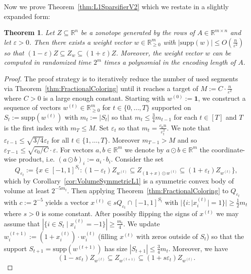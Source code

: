 \documentclass[12pt,english]{article}
\theoremstyle{theorem}
\newtheorem{theorem}{Theorem}
\theoremstyle{remark}
\providecommand{\setR}{\mathbb{R}}
\newcommand{\eps}{\varepsilon}
\begin{document}
Now we prove Theorem~\ref{thm:L1SparsifierV2} which we restate in a slightly expanded form:
\begin{theorem} \label{thm:L1SparsifierV2rephrased}
Let $Z \subseteq \setR^{n}$ be a zonotope generated by the rows of $A \in \setR^{m \times n}$ and let $\varepsilon >0$. Then there exists a weight vector $w \in \setR_{\geq 0}^m$ with $|\textrm{supp}(w)| \leq O(\frac{n}{\varepsilon^2})$ so that
$(1-\varepsilon) Z \subseteq Z_w \subseteq (1+\varepsilon) Z$.
Moreover, the weight vector $w$ can be computed in randomized time $2^m$ times a polynomial in the encoding length of $A$.
\end{theorem}
\begin{proof}
  The proof strategy is to iteratively reduce the number of used segments via Theorem~\ref{thm:FractionalColoring} until it reaches a target of $M := C \cdot \frac{n}{\eps^2}$ where $C>0$ is a large enough constant.
  Starting with $w^{(0)} := \bm{1}$, we construct a sequence of vectors $w^{(t)} \in \setR^{m}_{\geq 0}$ for $t \in \{0, \dots, T\}$ supported on $S_t := \textrm{supp}(w^{(t)})$ with $m_t := |S_t|$ so that $m_t \le \tfrac{3}{4} m_{t-1}$ for each $t \in [T]$ and $T$ is the first index with  $m_T \le M$.
  Set $\eps_t$ so that $m_t = \frac{c_0n}{\eps_t^2}$. We note that $\varepsilon_{t-1} \leq \sqrt{3/4} \varepsilon_t$ for all $t \in \{ 1,\ldots,T\}$. Moreover $m_{T-1} > M$ and so $\varepsilon_{T-1} \leq \sqrt{c_0/C} \cdot \varepsilon$.
  For vectors $a,b \in \setR^m$ we denote by $a \odot b \in \setR^m$ the coordinate-wise product, i.e. $(a \odot b)_i := a_i \cdot b_i$. Consider the set
  \[ Q_{\eps_t} := \Big\{x \in [-1,1]^{S_t} : (1-\varepsilon_t) Z_{w^{(t)}} \subseteq Z_{(\bm{1}+x) \odot w^{(t)}} \subseteq (1+\varepsilon_t) Z_{w^{(t)}} \Big\},
  \]
  which by Corollary~\ref{cor:VolumeSymmetricL1} is a symmetric convex body
  of volume at least $2^{-5m_t}$. Then applying Theorem~\ref{thm:FractionalColoring} to $Q_{\varepsilon_t}$ with $c := 2^{-5}$ yields a vector $x^{(t)} \in sQ_{\eps_t} \cap [-1,1]^{S_t}$ with $|\{ i : |x^{(t)}_i| = 1\}| \ge \tfrac{1}{2} m_t$ where $s>0$ is some constant. After possibly flipping the signs
 of $x^{(t)}$  we may assume that $|\{i \in S_t \mid x^{(t)}_i = -1\}| \geq \frac{m_t}{4}$. We update $w^{(t+1)}_i := (1+x^{(t)}_i) \cdot w^{(t)}_i$ (filling $x^{(t)}$ with zeros outside of $S_t$) so that the support $S_{t+1} = \textrm{supp}(w^{(t+1)})$ has size $|S_{t+1}| \leq \frac{3}{4} m_t$.
  Moreover, we have
  \[
    (1-s \varepsilon_t) Z_{w^{(t)}} \subseteq Z_{w^{(t+1)}} \subseteq (1+s\varepsilon_t) Z_{w^{(t)}}.
\]
\end{proof}
\end{document}
